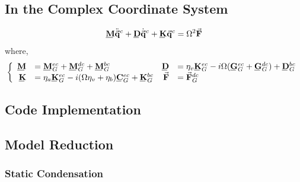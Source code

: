 \subsection{In the Complex Coordinate System}
\begin{equation}\label{eq:GlobalSystemofEquationsComplex}
\bunderline{\mathbf{M}}\ddot{\vec{\mathbf{q}}}^c+\bunderline{\mathbf{D}}\dot{\vec{\mathbf{q}}}^c+\bunderline{\mathbf{K}}\vec{\mathbf{q}}^c=\Omega^2\vec{\mathbf{F}}
\end{equation}
where,
\begin{equation*}
\left\{\begin{array}{rlrl}
\bunderline{\mathbf{M}}&=\bunderline{\mathbf{M}}^{ec}_G+\bunderline{\mathbf{M}}^{dc}_G+\bunderline{\mathbf{M}}^{bc}_G&\bunderline{\mathbf{D}}&=\eta_v\bunderline{\mathbf{K}}^{ec}_G-i\Omega(\bunderline{\mathbf{G}}^{ec}_G+\bunderline{\mathbf{G}}^{dc}_G)+\bunderline{\mathbf{D}}^{bc}_G\\
\bunderline{\mathbf{K}}&=\eta_a\bunderline{\mathbf{K}}^{ec}_G-i(\Omega\eta_v+\eta_b)\bunderline{\mathbf{C}}^{ec}_G+\bunderline{\mathbf{K}}^{bc}_G&\vec{\mathbf{F}}&=\vect{F}^{dc}_G
\end{array}\right.
\end{equation*}
\subsection{Code Implementation}
\subsection{Model Reduction}
\subsubsection{Static Condensation}
